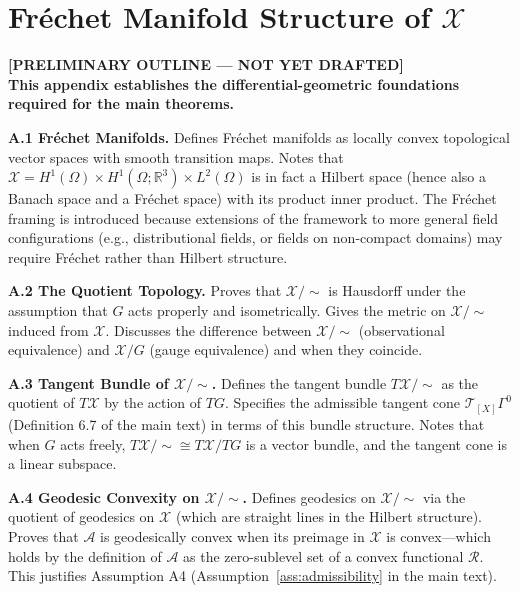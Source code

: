 \documentclass[12pt, oneside]{article}
\newcommand{\preliminary}[1]{%
  \colorbox{yellow!20}{\parbox{\dimexpr\linewidth-2\fboxsep}{%
    \textbf{\textcolor{red!70!black}{[PRELIMINARY OUTLINE --- NOT YET DRAFTED]}}\\[4pt]
    #1
  }}%
}
\newcommand{\Xmod}{\mathcal{X}/{\sim}}
\begin{document}

\appendix

\section{Fréchet Manifold Structure of $\mathcal{X}$}
\label{app:frechet}

\preliminary{
\textbf{This appendix establishes the differential-geometric foundations required for the
main theorems.}

\medskip
\textbf{A.1 Fréchet Manifolds.}
Defines Fréchet manifolds as locally convex topological vector spaces with smooth
transition maps. Notes that $\mathcal{X} = H^1(\Omega) \times H^1(\Omega;\mathbb{R}^3)
\times L^2(\Omega)$ is in fact a Hilbert space (hence also a Banach space and a Fréchet
space) with its product inner product. The Fréchet framing is introduced because
extensions of the framework to more general field configurations (e.g., distributional
fields, or fields on non-compact domains) may require Fréchet rather than Hilbert
structure.

\medskip
\textbf{A.2 The Quotient Topology.}
Proves that $\Xmod$ is Hausdorff under the assumption that $G$ acts properly and
isometrically. Gives the metric on $\Xmod$ induced from $\mathcal{X}$. Discusses the
difference between $\Xmod$ (observational equivalence) and $\mathcal{X}/G$
(gauge equivalence) and when they coincide.

\medskip
\textbf{A.3 Tangent Bundle of $\Xmod$.}
Defines the tangent bundle $T\Xmod$ as the quotient of $T\mathcal{X}$ by the action of
$TG$. Specifies the admissible tangent cone $\mathcal{T}_{[X]}\Gamma^0$ (Definition 6.7
of the main text) in terms of this bundle structure. Notes that when $G$ acts freely,
$T\Xmod \cong T\mathcal{X}/TG$ is a vector bundle, and the tangent cone is a linear
subspace.

\medskip
\textbf{A.4 Geodesic Convexity on $\Xmod$.}
Defines geodesics on $\Xmod$ via the quotient of geodesics on $\mathcal{X}$ (which are
straight lines in the Hilbert structure). Proves that $\mathcal{A}$ is geodesically convex
when its preimage in $\mathcal{X}$ is convex---which holds by the definition of
$\mathcal{A}$ as the zero-sublevel set of a convex functional $\mathcal{R}$. This justifies
Assumption A4 (Assumption~\ref{ass:admissibility} in the main text).
}
\end{document}

